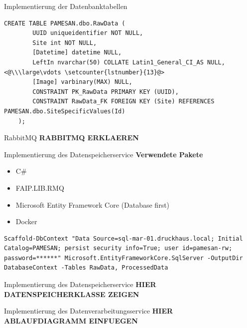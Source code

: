\documentclass[10pt,ngerman]{beamer}
\begin{document}
\begin{frame}[fragile]{Implementierung der Datenbanktabellen}
  \begin{lstlisting}[style=sql-style,
    breaklines=true]
    CREATE TABLE PAMESAN.dbo.RawData (
        UUID uniqueidentifier NOT NULL,
        Site int NOT NULL,
        [Datetime] datetime NULL,
        LeftIn nvarchar(50) COLLATE Latin1_General_CI_AS NULL, <@\\\large\vdots \setcounter{lstnumber}{13}@>
        [Image] varbinary(MAX) NULL,
        CONSTRAINT PK_RawData PRIMARY KEY (UUID),
        CONSTRAINT RawData_FK FOREIGN KEY (Site) REFERENCES PAMESAN.dbo.SiteSpecificValues(Id)
    );
\end{lstlisting}
\end{frame}


\begin{frame}[fragile]{RabbitMQ}
  \textbf{RABBITMQ ERKLAEREN}
\end{frame}


\begin{frame}[fragile]{Implementierung des Datenspeicherservice}
  \textbf{Verwendete Pakete}
  \begin{itemize}
    \item C\#
    \item FAIP.LIB.RMQ
    \item Microsoft Entity Framework Core (Database first)
    \item Docker
  \end{itemize}

  \pause

  \begin{lstlisting}[style=bash-style,
    breaklines=true]
    Scaffold-DbContext "Data Source=sql-mar-01.druckhaus.local; Initial Catalog=PAMESAN; persist security info=True; user id=pamesan-rw; password=******" Microsoft.EntityFrameworkCore.SqlServer -OutputDir DatabaseContext -Tables RawData, ProcessedData
\end{lstlisting}
\end{frame}


\begin{frame}[fragile]{Implementierung des Datenspeicherservice}
  \textbf{HIER DATENSPEICHERKLASSE ZEIGEN}
\end{frame}


\begin{frame}[fragile]{Implementierung des Datenverarbeitungsservice}
  \textbf{HIER ABLAUFDIAGRAMM EINFUEGEN}
\end{frame}
\end{document}

